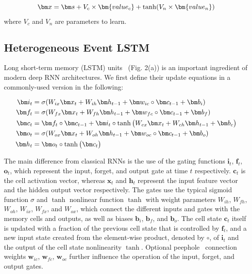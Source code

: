 \documentclass[letterpaper]{article} %
\begin{document}
\begin{equation}
\setlength{\abovedisplayskip}{3pt}
\bm x = \bm s + V_c \times \bm{value_c} + \tanh( V_n \times \bm{value_n})
\setlength{\belowdisplayskip}{3pt}
\end{equation}
where   $V_c$ and $V_n$  are parameters to learn.

\subsection{Heterogeneous Event LSTM}


Long short-term memory (LSTM) units~\cite{hochreiter1997long} (Fig. 2(a)) is an important ingredient of modern deep
RNN architectures. We first define their update equations in a commonly-used version in the following:

\begin{align}\label{grubegin}
\setlength{\abovedisplayskip}{3pt}
\bm i_t &= \sigma(W_{ix}\bm x_t+ W_{ih}\bm h_{t-1} + \bm w_{ic} \circ \bm c_{t-1}+ \bm b_i)\\
\bm f_t &= \sigma(W_{fx}\bm x_t+ W_{fh}\bm h_{t-1} + \bm w_{fc} \circ \bm c_{t-1} + \bm b_f)\\
\bm c_t &= \bm f_t \circ \bm c_{t-1} + \bm i_t \circ \tanh\big (W_{cx}\bm x_t+ W_{ch} \bm h_{t-1} + \bm b_c \big) \\
\bm o_t &= \sigma(W_{ox}\bm x_t+ W_{oh}\bm h_{t-1} + \bm w_{oc} \circ \bm c_{t-1} + \bm b_o)\\
\bm h_t &= \bm o_t \circ \tanh \big( \bm c_t \big)
\label{gruend}
\setlength{\belowdisplayskip}{3pt}
\end{align}

The main difference from classical RNNs is the use of the gating functions $\bm i_t$, $\bm f_t$, $\bm o_t$, which represent
the input, forget, and output gate at time $t$ respectively. $\bm c_t$ is the cell activation vector, whereas $\bm x_t$
and $\bm h_t$ represent the input feature vector and the hidden output vector respectively.
The gates use the
typical sigmoid function $\sigma $ and $\tanh$ nonlinear function $\tanh$ with weight parameters
$W_{ih}$, $W_{fh}$, $W_{oh}$, $W_{ix}$, $W_{fx}$, and $W_{ox}$, which connect the different inputs and gates with the memory
cells and outputs, as well as biases $\bm b_i$, $\bm b_f$, and $\bm b_o$. The cell state $\bm c_t$ itself is updated with a fraction of the previous cell state that is controlled by $\bm f_t$, and a new input state created from the element-wise product, denoted by $\circ$, of $\bm i_t$ and the output of the cell state nonlinearity $\tanh$. Optional peephole~\cite{gers2000recurrent} connection weights $\bm w_{ic}$, $\bm w_{fc}$, $\bm w_{oc}$ further influence the operation of the input, forget,
and output gates.
\end{document}

